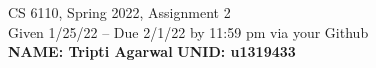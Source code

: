 \documentclass[11pt]{article}
\begin{document}



\begin{center}
\begin{large}
  CS 6110, Spring 2022, Assignment 2  \\
  Given 1/25/22 -- Due 2/1/22 by 11:59 pm via your Github 
  \ \\
    {  {\Large\bf NAME: Tripti Agarwal} \hfill {\Large\bf UNID: u1319433 }\hspace{4cm} }
          \ \\
\end{large}

\end{center}
\end{document}
